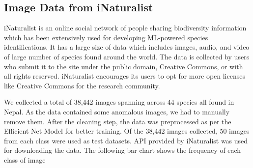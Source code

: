 \documentclass[fleqn, 10pt, twoside]{IOEGC}
\begin{document}
\subsection{Image Data from iNaturalist}
iNaturalist is an online social network of people sharing biodiversity information which has been extensively used for developing ML-powered species identifications. It has a large size of data which includes images, audio, and video of large number of species found around the world. The data is collected by users who submit it to the site under the public domain, Creative Commons, or with all rights reserved. iNaturalist encourages its users to opt for more open licenses like Creative Commons for the research community.
\par
We collected a total of 38,442 images spanning across 44 species all found in Nepal. As the data contained some anomalous images, we had to manually remove them. After the cleaning step, the data was preprocessed as per the Efficient Net Model for better training. Of the 38,442 images collected, 50 images from each class were used as test datasets.
API provided by iNaturalist was used for downloading the data. The following bar chart shows the frequency of each class of image
\end{document}
